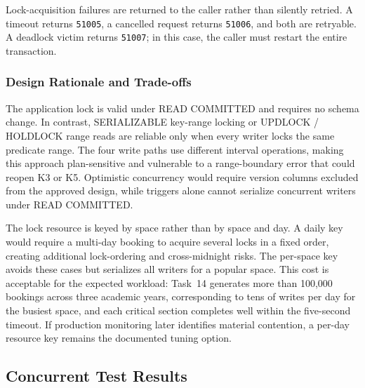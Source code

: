 Lock-acquisition failures are returned to the caller rather than silently
retried. A timeout returns \texttt{51005}, a cancelled request returns
\texttt{51006}, and both are retryable. A deadlock victim returns
\texttt{51007}; in this case, the caller must restart the entire transaction.

\subsubsection{Design Rationale and Trade-offs}

The application lock is valid under READ COMMITTED and requires no
schema change. In contrast, SERIALIZABLE key-range locking or UPDLOCK / HOLDLOCK range reads are reliable only when every
writer locks the same predicate range. The four write paths use different
interval operations, making this approach plan-sensitive and vulnerable to a
range-boundary error that could reopen K3 or K5. Optimistic concurrency would
require version columns excluded from the approved design, while triggers alone
cannot serialize concurrent writers under READ COMMITTED.

The lock resource is keyed by space rather than by space and day. A daily key
would require a multi-day booking to acquire several locks in a fixed order,
creating additional lock-ordering and cross-midnight risks. The per-space key
avoids these cases but serializes all writers for a popular space. This cost is
acceptable for the expected workload: Task~14 generates more than 100{,}000
bookings across three academic years, corresponding to tens of writes per day
for the busiest space, and each critical section completes well within the
five-second timeout. If production monitoring later identifies material
contention, a per-day resource key remains the documented tuning option.

\subsection{Concurrent Test Results}
\label{subsec:concurrency-tests}

